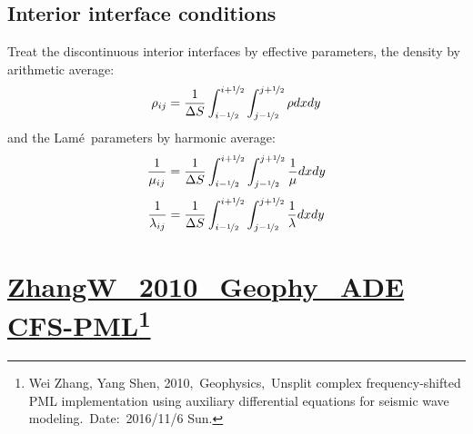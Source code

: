 \documentclass{article}
\newcommand{\Ppath}{/home/tche/Learning/Learning/Paper/}
\newcommand{\prf}{This is relative path from \Papth to the paper file}
\newcommand{\pmk}{This is the brief info.}
\newcommand{\pti}{This is the paper tile}
\newcommand{\pay}{These are authors and year}
\newcommand{\pjo}{This is the journal}
\newcommand{\pda}{This is the date}
\newcommand{\refp}[1]{\href{run:\Ppath\prf}{#1}}
\newcommand{\pinfo}{\refp{\pmk}\footnote{\pay,~\pjo,~\pti.~Date:~\pda}}
\newcommand{\Lame}{Lam\'{e}~}
\begin{document}
\subsection{Interior interface conditions}
Treat the discontinuous interior interfaces by effective parameters, the density by arithmetic average:
\[ \rho_{ij}=\frac{1}{\Delta S}\int_{i-\nicefrac{1}{2}}^{i+\nicefrac{1}{2}}\int_{j-\nicefrac{1}{2}}^{j+\nicefrac{1}{2}}\rho dxdy \]
and the \Lame parameters by harmonic average:
\[ \frac{1}{\mu_{ij}}=\frac{1}{\Delta S}\int_{i-\nicefrac{1}{2}}^{i+\nicefrac{1}{2}}\int_{j-\nicefrac{1}{2}}^{j+\nicefrac{1}{2}}\frac{1}{\mu}dxdy \]
\[ \frac{1}{\lambda_{ij}}=\frac{1}{\Delta S}\int_{i-\nicefrac{1}{2}}^{i+\nicefrac{1}{2}}\int_{j-\nicefrac{1}{2}}^{j+\nicefrac{1}{2}}\frac{1}{\lambda}dxdy \]\par
\vspace{5mm}

\renewcommand{\pmk}{ZhangW\_2010\_Geophy\_ADE CFS-PML}
\renewcommand{\prf}{WaveForward/\pmk.pdf}
\renewcommand{\pti}{Unsplit complex frequency-shifted PML implementation using auxiliary differential equations for seismic wave modeling}
\renewcommand{\pay}{Wei Zhang, Yang Shen, 2010}
\renewcommand{\pjo}{Geophysics}
\renewcommand{\pda}{2016/11/6 Sun.}
\section{\pinfo}
\end{document}
